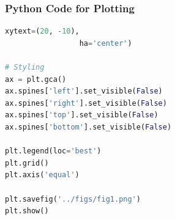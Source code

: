 \documentclass{beamer}
\theoremstyle{remark}
\numberwithin{equation}{section}
\begin{document}
\begin{frame}[fragile]
\frametitle{Python Code for Plotting}
\begin{lstlisting}[language=Python]
                 xytext=(20, -10),
                 ha='center')

# Styling
ax = plt.gca()
ax.spines['left'].set_visible(False)
ax.spines['right'].set_visible(False)
ax.spines['top'].set_visible(False)
ax.spines['bottom'].set_visible(False)

plt.legend(loc='best')
plt.grid()
plt.axis('equal')

plt.savefig('../figs/fig1.png')
plt.show()
\end{lstlisting}
\end{frame}
\end{document}
